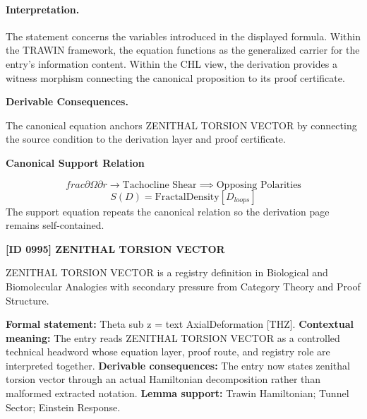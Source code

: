 \paragraph{Interpretation.}
The statement concerns the variables introduced in the displayed formula. Within the TRAWIN framework, the equation functions as the generalized carrier for the entry’s information content. Within the CHL view, the derivation provides a witness morphism connecting the canonical proposition to its proof certificate.

\par\vspace{0.35em}
\noindent\textbf{Derivable Consequences.}\quad
\begingroup
\footnotesize
\raggedright
The canonical equation anchors ZENITHAL TORSION VECTOR by connecting the source condition to the derivation layer and proof certificate.
\par\endgroup

\noindent\textbf{Canonical Support Relation}\par
\[
frac{\partial \Omega}{\partial r} \to \text{Tachocline Shear} \implies \text{Opposing Polarities}
\]
\[
S(D) = \text{FractalDensity}[D_{loops}]
\]
\noindent The support equation repeats the canonical relation so the derivation page remains self-contained.\par

\clearpage
\noindent\textbf{[ID 0995] ZENITHAL TORSION VECTOR}\par
\vspace{0.35em}
\begingroup\small
{}
ZENITHAL TORSION VECTOR is a registry definition in Biological and Biomolecular Analogies with secondary pressure from Category Theory and Proof Structure.

\begingroup\footnotesize\setlength{\emergencystretch}{3em}\sloppy
\textbf{Formal statement:} Theta sub z = text AxialDeformation [THZ]. \textbf{Contextual meaning:} The entry reads ZENITHAL TORSION VECTOR as a controlled technical headword whose equation layer, proof route, and registry role are interpreted together. \textbf{Derivable consequences:} The entry now states zenithal torsion vector through an actual Hamiltonian decomposition rather than malformed extracted notation. \textbf{Lemma support:} Trawin Hamiltonian; Tunnel Sector; Einstein Response.\par
\endgroup

